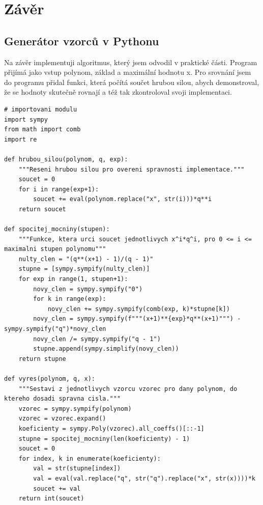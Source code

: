 \documentclass[12pt]{report}			%
\begin{document}
	\chapter*{Závěr}
	
		\lipsum[1]
	
	\nocite{*}
    \printbibliography					%
    \printglossary[title={Zkratky}]		%
    \listoffigures						%
    \listoftables						%

    \begin{appendices}
	\chapter{Generátor vzorců v Pythonu}	
	Na závěr implementuji algoritmus, který jsem odvodil v praktické části. Program přijímá jako vstup polynom, základ a maximální hodnotu x. Pro srovnání jsem do programu přidal funkci, která počítá součet hrubou silou, abych demonstroval, že se hodnoty skutečně rovnají a též tak zkontroloval svoji implementaci.

\begin{lstlisting}[title={Generator.py}, caption={generator.py}, label={lst:hello_world}]
# importovani modulu
import sympy
from math import comb
import re

def hrubou_silou(polynom, q, exp):
	"""Reseni hrubou silou pro overeni spravnosti implementace."""
    soucet = 0
    for i in range(exp+1):
        soucet += eval(polynom.replace("x", str(i)))*q**i
    return soucet

def spocitej_mocniny(stupen):
	"""Funkce, ktera urci soucet jednotlivych x^i*q^i, pro 0 <= i <= maximalni stupen polynomu""" 
    nulty_clen = "(q**(x+1) - 1)/(q - 1)"
    stupne = [sympy.sympify(nulty_clen)]
    for exp in range(1, stupen+1):
        novy_clen = sympy.sympify("0")
        for k in range(exp):
            novy_clen += sympy.sympify(comb(exp, k)*stupne[k])
        novy_clen = sympy.sympify(f"""(x+1)**{exp}*q**(x+1)""") - sympy.sympify("q")*novy_clen
        novy_clen /= sympy.sympify("q - 1")
        stupne.append(sympy.simplify(novy_clen))
    return stupne

def vyres(polynom, q, x):
	"""Sestavi z jednotlivych vzorcu vzorec pro dany polynom, do ktereho dosadi spravna cisla."""
    vzorec = sympy.sympify(polynom)
    vzorec = vzorec.expand()
    koeficienty = sympy.Poly(vzorec).all_coeffs()[::-1]
    stupne = spocitej_mocniny(len(koeficienty) - 1)
    soucet = 0
    for index, k in enumerate(koeficienty):
        val = str(stupne[index])
        val = eval(val.replace("q", str("q").replace("x", str(x))))*k
        soucet += val
    return int(soucet)


\end{lstlisting}
\end{appendices}
\end{document}

